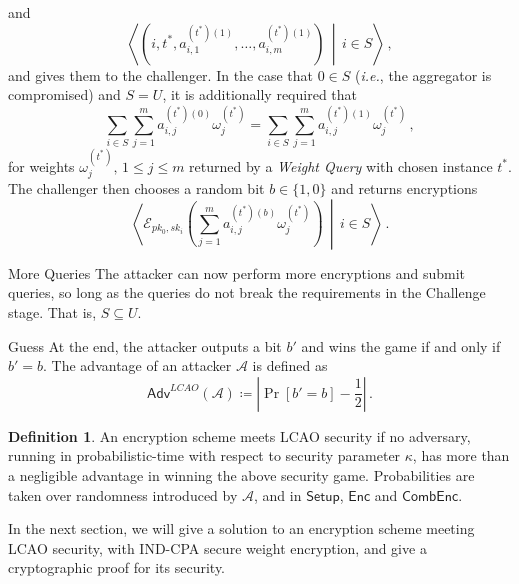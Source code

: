 \documentclass[10pt,letterpaper,oneside,twocolumn,journal]{IEEEtran}
\theoremstyle{definition}
\newtheorem{definition}{Definition}[section]
\theoremstyle{definition}
\theoremstyle{remark}
\begin{document}
\begin{LaTeXdescription}
\begin{equation*}
    \end{equation*}
    and
    \begin{equation*}
        \left\langle\left(i,t^*,a^{(t^*)(1)}_{i,1},\dots,a^{(t^*)(1)}_{i,m}\right)\,\middle|\, i \in S\right\rangle\,,
    \end{equation*}
    and gives them to the challenger. In the case that $0 \in S$ (\textit{i.e.}, the aggregator is compromised) and $S = U$, it is additionally required that
    \begin{equation*}
        \sum_{i\in S}\sum^{m}_{j=1} a^{(t^*)(0)}_{i,j}\omega^{(t^*)}_j = \sum_{i \in S}\sum^{m}_{j=1} a^{(t^*)(1)}_{i,j}\omega^{(t^*)}_j\,,
    \end{equation*}
    for weights $\omega^{(t^*)}_j,\,1\leq j \leq m$ returned by a \textit{Weight Query} with chosen instance $t^*$. The challenger then chooses a random bit $b \in \{1,0\}$ and returns encryptions 
    \begin{equation*}
        \left\langle\mathcal{E}_{pk_0,sk_i}\left(\sum^m_{j=1}a^{(t^*)(b)}_{i,j}\omega^{(t^*)}_j\right)\,\middle|\,i\in S\right\rangle\,.
    \end{equation*}
    \item[More Queries] The attacker can now perform more encryptions and submit queries, so long as the queries do not break the requirements in the Challenge stage. That is, $S \subseteq U$.
    \item[Guess] At the end, the attacker outputs a bit $b'$ and wins the game if and only if $b' = b$. The advantage of an attacker $\mathcal{A}$ is defined as
    \begin{equation*}
        \mathsf{Adv}^{LCAO}(\mathcal{A}) \coloneqq \left\lvert \Pr [b'=b] - \frac{1}{2}\right\rvert\,.
    \end{equation*} 
\end{LaTeXdescription}

\begin{definition}
    An encryption scheme meets LCAO security if no adversary, running in probabilistic-time with respect to security parameter $\kappa$, has more than a negligible advantage in winning the above security game. Probabilities are taken over randomness introduced by $\mathcal{A}$, and in $\mathsf{Setup}$, $\mathsf{Enc}$ and $\mathsf{CombEnc}$.
\end{definition}

In the next section, we will give a solution to an encryption scheme meeting LCAO security, with IND-CPA secure weight encryption, and give a cryptographic proof for its security.
\end{document}
